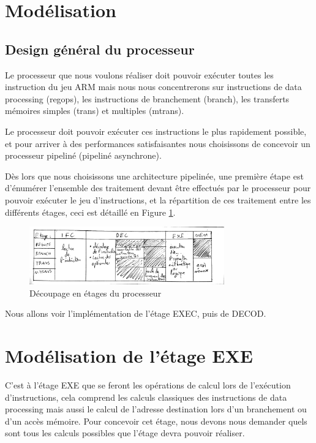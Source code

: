 \documentclass{article}
\begin{document}
\section{Modélisation}

\subsection{Design général du processeur}

Le processeur que nous voulons réaliser doit pouvoir exécuter toutes les instruction du jeu ARM
mais nous nous concentrerons sur instructions de data processing (regops),
les instructions de branchement (branch), les transferts mémoires simples (trans) et multiples (mtrans).

Le processeur doit pouvoir exécuter ces instructions le plus rapidement possible, et pour arriver à des
performances satisfaisantes nous choisissons de concevoir un processeur pipeliné (pipeliné asynchrone).

Dès lors que nous choisissons une architecture pipelinée, une première étape est d'énumérer l'ensemble
des traitement devant être effectués par le processeur pour pouvoir exécuter le jeu d'instructions,
et la répartition de ces traitement entre les différents étages, ceci est détaillé en Figure \ref{etages}.

\begin{figure}[H]
\includegraphics[width=0.75\textwidth]{pics/etages.png}
\centering
\caption{Découpage en étages du processeur}
\label{etages}
\end{figure}

Nous allons voir l'implémentation de l'étage EXEC, puis de DECOD.

\section{Modélisation de l'étage EXE}

\par
C'est à l'étage EXE que se feront les opérations de calcul lors de l'exécution d'instructions,
cela comprend les calculs classiques des instructions de data processing mais aussi le calcul de
l'adresse destination lors d'un branchement ou d'un accès mémoire.
Pour concevoir cet étage, nous devons nous demander quels sont tous les calculs possibles
que l'étage devra pouvoir réaliser.
\end{document}
